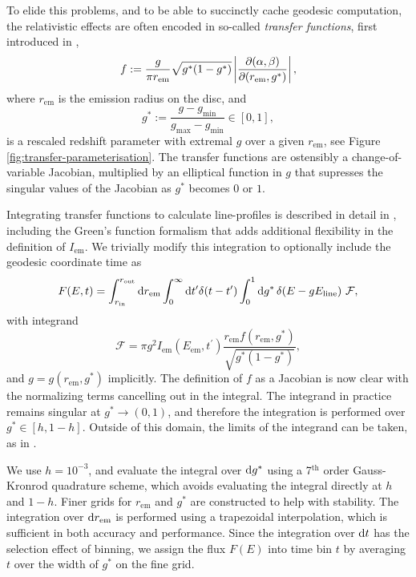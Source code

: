 
To elide this problems, and to be able to succinctly cache geodesic computation, the relativistic effects are often encoded in so-called \emph{transfer functions}, first introduced in \cite{cunningham_effects_1975},
\begin{equation}
    f:=\frac{g}{\pi r_\text{em}} \sqrt{g^\ast(1 - g^\ast)} \left\lvert \frac{\partial (\alpha, \beta)}{\partial (r_\text{em}, g^\ast)} \right\rvert,
\end{equation}
where $r_\text{em}$ is the emission radius on the disc, and
\begin{equation}
    g^\ast := \frac{g - g_\text{min}}{g_\text{max} - g_\text{min}} \in [0, 1],
\end{equation}
is a rescaled redshift parameter with extremal $g$ over a given $r_\text{em}$, see Figure \ref{fig:transfer-parameterisation}. The transfer functions are ostensibly a change-of-variable Jacobian, multiplied by an elliptical function in $g$ that supresses the singular values of the Jacobian as $g^\ast$ becomes $0$ or $1$.

Integrating transfer functions to calculate line-profiles is described in detail in \cite{dauser_broad_2010}, including the Green's function formalism that adds additional flexibility in the definition of $I_\text{em}$. We trivially modify this integration to optionally include the geodesic coordinate time as
\begin{equation}
    F(E, t) =
    \int_{r_\text{in}}^{r_\text{out}} \text{d} r_\text{em} \int_0^\infty \text{d} t^\prime \delta(t - t^\prime) \int_0^1 \text{d} g^\ast\, \delta(E - gE_\text{line})\,  \, \mathcal{F},
\end{equation}
with integrand
\begin{equation}
    \mathcal{F} = \pi g^2 I_\text{em}\left(E_\text{em}, t^\prime\right) \frac{r_\text{em} f(r_\text{em}, g^\ast)}{\sqrt{g^\ast (1 - g^\ast)}},
\end{equation}
and $g = g( r_\text{em}, g^\ast)$ implicitly. The definition of $f$ as a Jacobian is now clear with the normalizing terms cancelling out in the integral. The integrand in practice remains singular at $g^\ast \rightarrow (0, 1)$, and therefore the integration is performed over $g^\ast \in [h, 1 - h]$. Outside of this domain, the limits of the integrand can be taken, as in \cite{dauser_broad_2010}.


We use $h = 10^{-3}$, and evaluate the integral over $\text{d} g^\ast$ using a 7$^\text{th}$ order Gauss-Kronrod quadrature scheme, which avoids evaluating the integral directly at $h$ and $1 - h$. Finer grids for $r_\text{em}$ and $g^\ast$ are constructed to help with stability. The integration over $\text{d} r_\text{em}$ is performed using a trapezoidal interpolation, which is sufficient in both accuracy and performance. Since the integration over $\text{d} t$ has the selection effect of binning, we assign the flux $F(E)$ into time bin $t$ by averaging $t$ over the width of $g^\ast$ on the fine grid.

